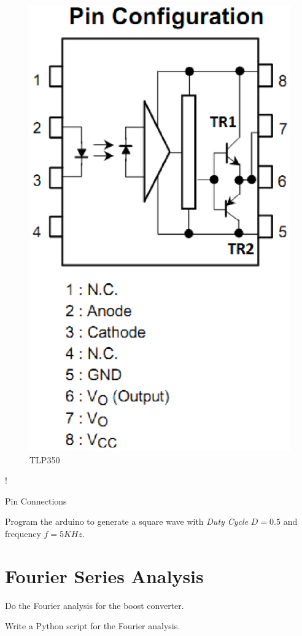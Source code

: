 \documentclass[journal,12pt,twocolumn]{IEEEtran}
\begin{document}
\begin{figure}[!h]
\centering
\includegraphics[width=\columnwidth]{./figs/pinout.eps}
\caption{ TLP350}  
\label{fig5}
\end{figure}

\begin{table}[!h]
\centering
\resizebox {\columnwidth} {!} {

}
\caption{Pin Connections} 
\label{table:connections}
\end{table}    
\begin{problem}
Program the arduino to generate a square wave with {\em Duty Cycle} $D=0.5$ and frequency $f=5KHz$.
\end{problem}
\solution
 
\section{Fourier Series Analysis}
\begin{problem}
Do the Fourier analysis for the boost converter.
\end{problem}
\begin{problem}
Write a Python script for the Fourier analysis.
\end{problem}
 
\end{document}
